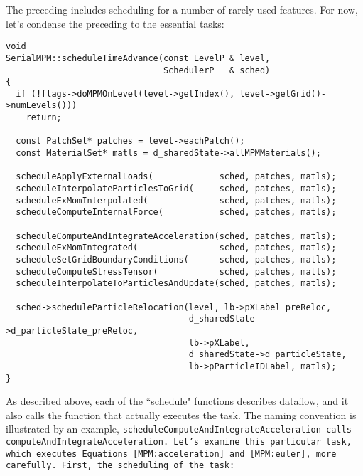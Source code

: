 The preceding includes scheduling for a number of rarely used features.
For now, let's condense the preceding to the essential tasks:

\begin{Verbatim}[fontsize=\footnotesize]
void
SerialMPM::scheduleTimeAdvance(const LevelP & level,
                               SchedulerP   & sched)
{
  if (!flags->doMPMOnLevel(level->getIndex(), level->getGrid()->numLevels()))
    return;

  const PatchSet* patches = level->eachPatch();
  const MaterialSet* matls = d_sharedState->allMPMMaterials();

  scheduleApplyExternalLoads(             sched, patches, matls);
  scheduleInterpolateParticlesToGrid(     sched, patches, matls);
  scheduleExMomInterpolated(              sched, patches, matls);
  scheduleComputeInternalForce(           sched, patches, matls);

  scheduleComputeAndIntegrateAcceleration(sched, patches, matls);
  scheduleExMomIntegrated(                sched, patches, matls);
  scheduleSetGridBoundaryConditions(      sched, patches, matls);
  scheduleComputeStressTensor(            sched, patches, matls);
  scheduleInterpolateToParticlesAndUpdate(sched, patches, matls);

  sched->scheduleParticleRelocation(level, lb->pXLabel_preReloc,
                                    d_sharedState->d_particleState_preReloc,
                                    lb->pXLabel,
                                    d_sharedState->d_particleState,
                                    lb->pParticleIDLabel, matls);
}
\end{Verbatim}

As described above, each of the ``schedule" functions describes dataflow,
and it also calls the function that actually executes the task.  The naming
convention is illustrated by an example,
\tt scheduleComputeAndIntegrateAcceleration \normalfont calls \tt computeAndIntegrateAcceleration. \normalfont
Let's examine this particular task, which executes
Equations~\ref{MPM:acceleration} and~\ref{MPM:euler}, more carefully.  First,
the scheduling of the task:

